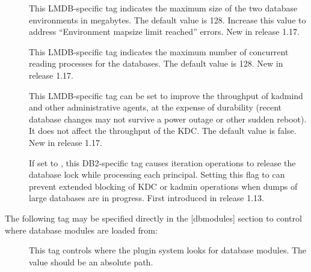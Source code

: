 \documentclass[letterpaper,10pt,english]{sphinxmanual}
\begin{document}
\begin{description}
\item[{}] \leavevmode
This LMDB-specific tag indicates the maximum size of the two
database environments in megabytes.  The default value is 128.
Increase this value to address “Environment mapsize limit reached”
errors.  New in release 1.17.

\item[{}] \leavevmode
This LMDB-specific tag indicates the maximum number of concurrent
reading processes for the databases.  The default value is 128.
New in release 1.17.

\item[{}] \leavevmode
This LMDB-specific tag can be set to improve the throughput of
kadmind and other administrative agents, at the expense of
durability (recent database changes may not survive a power outage
or other sudden reboot).  It does not affect the throughput of the
KDC.  The default value is false.  New in release 1.17.

\item[{}] \leavevmode
If set to , this DB2-specific tag causes iteration
operations to release the database lock while processing each
principal.  Setting this flag to  can prevent extended
blocking of KDC or kadmin operations when dumps of large databases
are in progress.  First introduced in release 1.13.

\end{description}

The following tag may be specified directly in the {[}dbmodules{]}
section to control where database modules are loaded from:
\begin{description}
\item[{}] \leavevmode
This tag controls where the plugin system looks for database
modules.  The value should be an absolute path.

\end{description}
\end{document}
